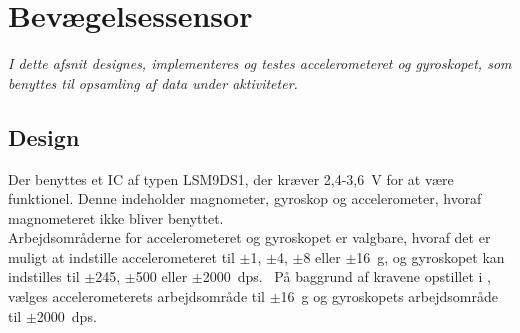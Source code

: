\section{Bevægelsessensor}\label{sec_design_LSM9DS1}
\textit{I dette afsnit designes, implementeres og testes accelerometeret og gyroskopet, som benyttes til opsamling af data under aktiviteter.}

\subsection{Design} \label{design_lsm}
Der benyttes et IC af typen LSM9DS1, der kræver 2,4-3,6~V for at være funktionel. Denne indeholder magnometer, gyroskop og accelerometer, hvoraf magnometeret ikke bliver benyttet.~\citep{Jimb02016,STMicroelectronics2016} \\ 
Arbejdsområderne for accelerometeret og gyroskopet er valgbare, hvoraf det er muligt at indstille accelerometeret til $\pm$1, $\pm$4, $\pm$8 eller $\pm$16~g, og gyroskopet kan indstilles til $\pm$245, $\pm$500 eller $\pm$2000~dps.~\citep{Jimb02016,STMicroelectronics2016} På baggrund af kravene opstillet i , vælges accelerometerets arbejdsområde til $\pm$16~g og gyroskopets arbejdsområde til $\pm$2000~dps. 


